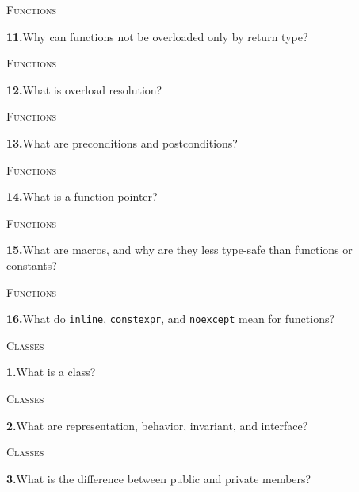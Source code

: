 \documentclass[11pt,a4paper]{article}
\newenvironment{questionblock}{%
  \begin{minipage}[t][0.455\textheight][t]{\textwidth}%
  \raggedright\small
}{%
  \vfill
  \end{minipage}%
}
\newcommand{\sectionlabel}[1]{\textsc{#1}\par\vspace{0.35em}}
\newcommand{\questionnumber}[1]{\textbf{#1.}\enspace}
\begin{document}
\vspace*{0.04\textheight}
\begin{questionblock}
\sectionlabel{Functions}
\questionnumber{11}Why can functions not be overloaded only by return type?\par
\end{questionblock}
\newpage
\begin{questionblock}
\sectionlabel{Functions}
\questionnumber{12}What is overload resolution?\par
\end{questionblock}
\vspace*{0.04\textheight}
\begin{questionblock}
\sectionlabel{Functions}
\questionnumber{13}What are preconditions and postconditions?\par
\end{questionblock}
\newpage
\begin{questionblock}
\sectionlabel{Functions}
\questionnumber{14}What is a function pointer?\par
\end{questionblock}
\vspace*{0.04\textheight}
\begin{questionblock}
\sectionlabel{Functions}
\questionnumber{15}What are macros, and why are they less type-safe than functions or constants?\par
\end{questionblock}
\newpage
\begin{questionblock}
\sectionlabel{Functions}
\questionnumber{16}What do \verb|inline|, \verb|constexpr|, and \verb|noexcept| mean for functions?\par

\end{questionblock}
\vspace*{0.04\textheight}
\begin{questionblock}
\sectionlabel{Classes}
\questionnumber{1}What is a class?\par
\end{questionblock}
\newpage
\begin{questionblock}
\sectionlabel{Classes}
\questionnumber{2}What are representation, behavior, invariant, and interface?\par
\end{questionblock}
\vspace*{0.04\textheight}
\begin{questionblock}
\sectionlabel{Classes}
\questionnumber{3}What is the difference between public and private members?\par
\end{questionblock}
\end{document}

